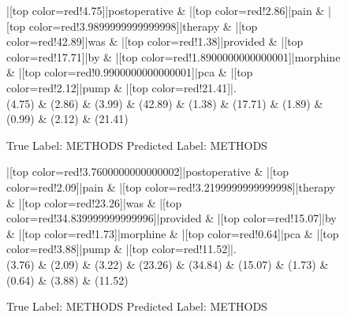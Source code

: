 \documentclass[a4paper, landscape]{article}
\begin{document}
\clearpage
\begin{figure}
\begin{center}
\begin{dependency}
\begin{deptext}
|[top color=red!4.75]|postoperative \& |[top color=red!2.86]|pain \& |[top color=red!3.9899999999999998]|therapy \& |[top color=red!42.89]|was \& |[top color=red!1.38]|provided \& |[top color=red!17.71]|by \& |[top color=red!1.8900000000000001]|morphine \& |[top color=red!0.9900000000000001]|pca \& |[top color=red!2.12]|pump \& |[top color=red!21.41]|.\\
(4.75) \& (2.86) \& (3.99) \& (42.89) \& (1.38) \& (17.71) \& (1.89) \& (0.99) \& (2.12) \& (21.41)\\
\end{deptext}
\end{dependency}
\end{center}
\caption{True Label: METHODS Predicted Label: METHODS}
\end{figure}
\clearpage
\begin{figure}
\begin{center}
\begin{dependency}
\begin{deptext}
|[top color=red!3.7600000000000002]|postoperative \& |[top color=red!2.09]|pain \& |[top color=red!3.2199999999999998]|therapy \& |[top color=red!23.26]|was \& |[top color=red!34.839999999999996]|provided \& |[top color=red!15.07]|by \& |[top color=red!1.73]|morphine \& |[top color=red!0.64]|pca \& |[top color=red!3.88]|pump \& |[top color=red!11.52]|.\\
(3.76) \& (2.09) \& (3.22) \& (23.26) \& (34.84) \& (15.07) \& (1.73) \& (0.64) \& (3.88) \& (11.52)\\
\end{deptext}
\end{dependency}
\end{center}
\caption{True Label: METHODS Predicted Label: METHODS}
\end{figure}
\end{document}

